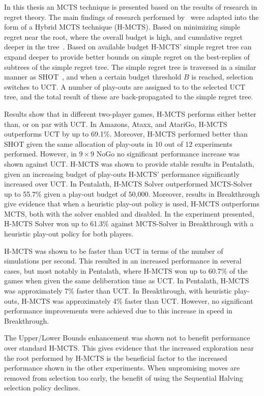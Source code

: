 \documentclass{kecsmstr}
\begin{document}
In this thesis an MCTS technique is presented based on the results of research in regret theory. The main findings of research performed by~ were adapted into the form of a Hybrid MCTS technique (H-MCTS). Based on minimizing simple regret near the root, where the overall budget is high, and cumulative regret deeper in the tree~. Based on available budget H-MCTS' simple regret tree can expand deeper to provide better bounds on simple regret on the best-replies of subtrees of the simple regret tree. The simple regret tree is traversed in a similar manner as SHOT~, and when a certain budget threshold $B$ is reached, selection switches to UCT. A number of play-outs are assigned to to the selected UCT tree, and the total result of these are back-propagated to the simple regret tree.

Results show that in different two-player games, H-MCTS performs either better than, or on par with UCT. In Amazons, Ataxx, and AtariGo, H-MCTS outperforms UCT by up to 69.1\%. Moreover, H-MCTS performed better than SHOT given the same allocation of play-outs in 10 out of 12 experiments performed. However, in $9\times 9$ NoGo no significant performance increase was shown against UCT. H-MCTS was shown to provide stable results in Pentalath, given an increasing budget of play-outs H-MCTS' performance significantly increased over UCT. In Pentalath, H-MCTS Solver outperformed MCTS-Solver up to 55.7\% given a play-out budget of 50,000. Moreover, results in Breakthrough give evidence that when a heuristic play-out policy is used, H-MCTS outperforms MCTS, both with the solver enabled and disabled. In the experiment presented, H-MCTS Solver won up to 61.3\% against MCTS-Solver in Breakthrough with a heuristic play-out policy for both players.

H-MCTS was shown to be faster than UCT in terms of the number of simulations per second. This resulted in an increased performance in several cases, but most notably in Pentalath, where H-MCTS won up to 60.7\% of the games when given the same deliberation time as UCT. In Pentalath, H-MCTS was approximately 7\% faster than UCT. In Breakthrough, with heuristic play-outs, H-MCTS was approximately 4\% faster than UCT. However, no significant performance improvements were achieved due to this increase in speed in Breakthrough.

The Upper/Lower Bounds enhancement was shown not to benefit performance over standard H-MCTS. This gives evidence that the increased exploration near the root performed by H-MCTS is the beneficial factor to the increased performance shown in the other experiments. When unpromising moves are removed from selection too early, the benefit of using the Sequential Halving selection policy declines.
\end{document}
